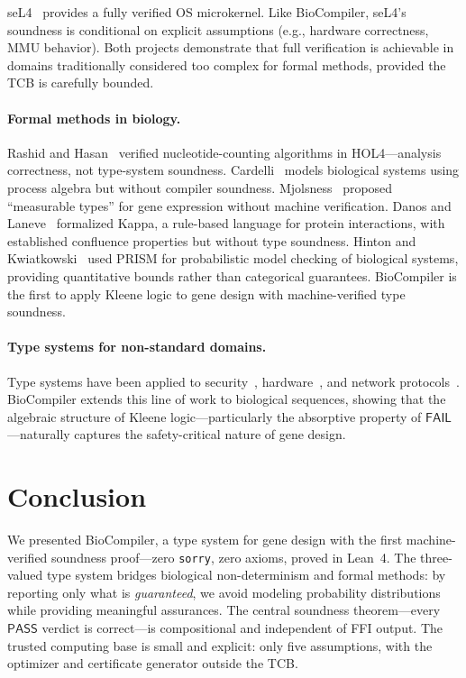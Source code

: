 \documentclass[runningheads]{llncs}
\newcommand{\PASS}{\ensuremath{\mathsf{PASS}}\xspace}
\newcommand{\FAIL}{\ensuremath{\mathsf{FAIL}}\xspace}
\begin{document}
seL4~\cite{klein2014sel4} provides a fully verified OS microkernel.
Like BioCompiler, seL4's soundness is conditional on explicit assumptions (e.g., hardware correctness, MMU behavior).
Both projects demonstrate that full verification is achievable in domains traditionally considered too complex for formal methods, provided the TCB is carefully bounded.

\paragraph{Formal methods in biology.}
Rashid and Hasan~\cite{rashid2017hol4} verified nucleotide-counting algorithms in HOL4---analysis correctness, not type-system soundness.
Cardelli~\cite{cardelli2008process} models biological systems using process algebra but without compiler soundness.
Mjolsness~\cite{mjolsness2010measurable} proposed ``measurable types'' for gene expression without machine verification.
Danos and Laneve~\cite{danos2004formal} formalized Kappa, a rule-based language for protein interactions, with established confluence properties but without type soundness.
Hinton and Kwiatkowski~\cite{hinton2004prism} used PRISM for probabilistic model checking of biological systems, providing quantitative bounds rather than categorical guarantees.
BioCompiler is the first to apply Kleene logic to gene design with machine-verified type soundness.

\paragraph{Type systems for non-standard domains.}
Type systems have been applied to security~\cite{abadi1999security}, hardware~\cite{hanna2010hardware}, and network protocols~\cite{mandel2005bidirectional}.
BioCompiler extends this line of work to biological sequences, showing that the algebraic structure of Kleene logic---particularly the absorptive property of $\FAIL$---naturally captures the safety-critical nature of gene design.

\section{Conclusion}\label{sec:conclusion}

We presented BioCompiler, a type system for gene design with the first machine-verified soundness proof---zero \texttt{sorry}, zero axioms, proved in Lean~4.
The three-valued type system bridges biological non-determinism and formal methods: by reporting only what is \emph{guaranteed}, we avoid modeling probability distributions while providing meaningful assurances.
The central soundness theorem---every \PASS{} verdict is correct---is compositional and independent of FFI output.
The trusted computing base is small and explicit: only five assumptions, with the optimizer and certificate generator outside the TCB.
\end{document}
